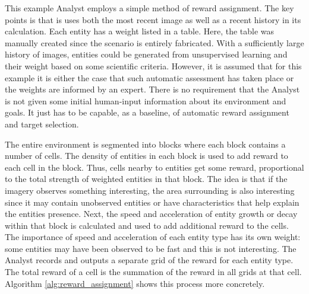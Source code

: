 \documentclass{tamuccthesis}
\begin{document}
This example Analyst employs a simple method of reward assignment. The key points is that is uses both the most recent image as well as a recent history in its calculation. Each entity has a weight listed in a table. Here, the table was manually created since the scenario is entirely fabricated. With a sufficiently large history of images, entities could be generated from unsupervised learning and their weight based on some scientific criteria. However, it is assumed that for this example it is either the case that such automatic assessment has taken place or the weights are informed by an expert. There is no requirement that the Analyst is not given some initial human-input information about its environment and goals. It just has to be capable, as a baseline, of automatic reward assignment and target selection. 

The entire environment is segmented into blocks where each block contains a number of cells. The density of entities in each block is used to add reward to each cell in the block. Thus, cells nearby to entities get some reward, proportional to the total strength of weighted entities in that block. The idea is that if the imagery observes something interesting, the area surrounding is also interesting since it may contain unobserved entities or have characteristics that help explain the entities presence. Next, the speed and acceleration of entity growth or decay within that block is calculated and used to add additional reward to the cells. The importance of speed and acceleration of each entity type has its own weight: some entities may have been observed to be fast and this is not interesting. The Analyst records and outputs a separate grid of the reward for each entity type. The total reward of a cell is the summation of the reward in all grids at that cell. Algorithm \ref{alg:reward_assignment} shows this process more concretely. 
\end{document}

